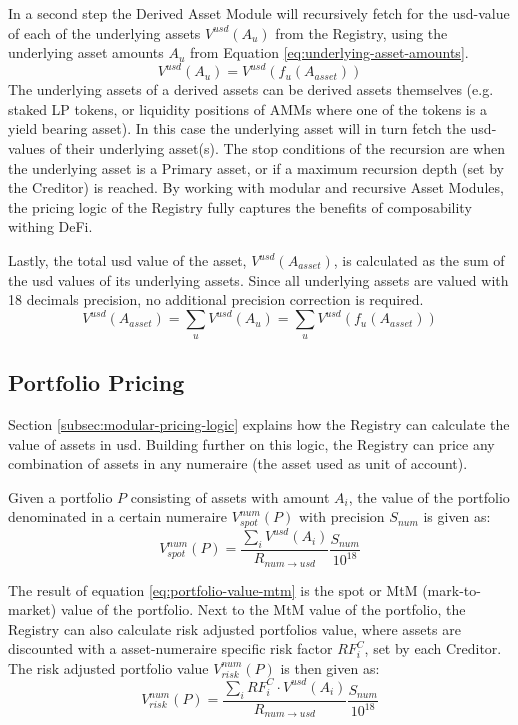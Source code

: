 \documentclass[sigconf,nonacm]{acmart}
\begin{document}
In a second step the Derived Asset Module will recursively fetch for the usd-value of each of the underlying assets $V^{usd}(A_{u})$ from the Registry,
using the underlying asset amounts $A_{u}$ from Equation \ref{eq:underlying-asset-amounts}.
\begin{equation}
    V^{usd}(A_{u}) = V^{usd}(f_{u}(A_{asset}))
\end{equation}
The underlying assets of a derived assets can be derived assets themselves (e.g. staked LP tokens, or liquidity positions of AMMs where one of the tokens is a yield bearing asset).
In this case the underlying asset will in turn fetch the usd-values of their underlying asset(s).
The stop conditions of the recursion are when the underlying asset is a Primary asset, or if a maximum recursion depth (set by the Creditor) is reached.
By working with modular and recursive Asset Modules, the pricing logic of the Registry fully captures the benefits of composability withing DeFi.

Lastly, the total usd value of the asset, $V^{usd}(A_{asset})$, is calculated as the sum of the usd values of its underlying assets.
Since all underlying assets are valued with 18 decimals precision, no additional precision correction is required.
\begin{equation}
    V^{usd}(A_{asset}) = \sum_{u}{V^{usd}(A_{u})} = \sum_{u}{V^{usd}(f_{u}(A_{asset}))}
\end{equation}

\subsection{Portfolio Pricing}
Section \ref{subsec:modular-pricing-logic} explains how the Registry can calculate the value of assets in usd.
Building further on this logic, the Registry can price any combination of assets in any numeraire (the asset used as unit of account).

Given a portfolio $P$ consisting of assets with amount $A_{i}$, the value of the portfolio denominated in a certain numeraire $V_{spot}^{num}(P)$ with precision $S_{num}$ is given as:
\begin{equation}
    \label{eq:portfolio-value-mtm}
    V_{spot}^{num}(P) = \frac{\sum_{i}{V^{usd}(A_{i})}}{R_{num\rightarrow usd}}\frac{S_{num}}{10^{18}}
\end{equation}

The result of equation \ref{eq:portfolio-value-mtm} is the spot or MtM (mark-to-market) value of the portfolio.
Next to the MtM value of the portfolio, the Registry can also calculate risk adjusted portfolios value,
where assets are discounted with a asset-numeraire specific risk factor $RF_{i}^{C}$, set by each Creditor.
The risk adjusted portfolio value $V_{risk}^{num}(P)$ is then given as:
\begin{equation}
    V_{risk}^{num}(P) = \frac{\sum_{i}{RF_{i}^{C} \cdot V^{usd}(A_{i})}}{R_{num\rightarrow usd}}\frac{S_{num}}{10^{18}}
\end{equation}
\end{document}
